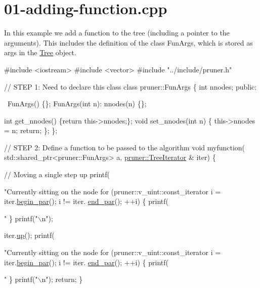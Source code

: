 \hypertarget{01-adding-function_8cpp-example}{}\section{01-\/adding-\/function.\+cpp}
In this example we add a function to the tree (including a pointer to the arguments). This includes the definition of the class Fun\+Args, which is stored as args in the \hyperlink{classTree}{Tree} object.


\begin{DoxyCodeInclude}
\textcolor{preprocessor}{#include <iostream>}
\textcolor{preprocessor}{#include <vector>}
\textcolor{preprocessor}{#include "../include/pruner.h"}

\textcolor{comment}{// STEP 1: Need to declare this class}
\textcolor{keyword}{class }pruner::FunArgs \{
  \textcolor{keywordtype}{int} nnodes;
\textcolor{keyword}{public}:
  
  ~FunArgs() \{\};
  FunArgs(\textcolor{keywordtype}{int} n): nnodes(n) \{\};
  
  \textcolor{keywordtype}{int} get\_nnodes() \{\textcolor{keywordflow}{return} this->nnodes;\};
  \textcolor{keywordtype}{void} set\_nnodes(\textcolor{keywordtype}{int} n) \{
    this->nnodes = n;
    \textcolor{keywordflow}{return};
  \};
\};

\textcolor{comment}{// STEP 2: Define a function to be passed to the algorithm}
\textcolor{keywordtype}{void} myfunction(
    std::shared\_ptr<pruner::FunArgs> a,
    \hyperlink{classpruner_1_1TreeIterator}{pruner::TreeIterator} & iter) \{
  
  \textcolor{comment}{// Moving a single step up}
  printf(\textcolor{stringliteral}{"Currently sitting on the node %
  \textcolor{keywordflow}{for} (pruner::v\_uint::const\_iterator i = iter.\hyperlink{classpruner_1_1TreeIterator_a3cb8dd28630f065472e135f7db822abf}{begin\_par}(); i != iter.
      \hyperlink{classpruner_1_1TreeIterator_aac5656fc5b550cb8dfa4a9ebd5ea910a}{end\_par}(); ++i) \{
    printf(\textcolor{stringliteral}{" %
  \}
  printf(\textcolor{stringliteral}{"\(\backslash\)n"});
  
  iter.\hyperlink{classpruner_1_1TreeIterator_adca1d999f093a69e2f5d044b358e5da7}{up}();
  printf(\textcolor{stringliteral}{"Currently sitting on the node %
  \textcolor{keywordflow}{for} (pruner::v\_uint::const\_iterator i = iter.\hyperlink{classpruner_1_1TreeIterator_a3cb8dd28630f065472e135f7db822abf}{begin\_par}(); i != iter.
      \hyperlink{classpruner_1_1TreeIterator_aac5656fc5b550cb8dfa4a9ebd5ea910a}{end\_par}(); ++i) \{
    printf(\textcolor{stringliteral}{" %
  \}
  printf(\textcolor{stringliteral}{"\(\backslash\)n"});
  \textcolor{keywordflow}{return};
\}

}}}}
\end{DoxyCodeInclude}
